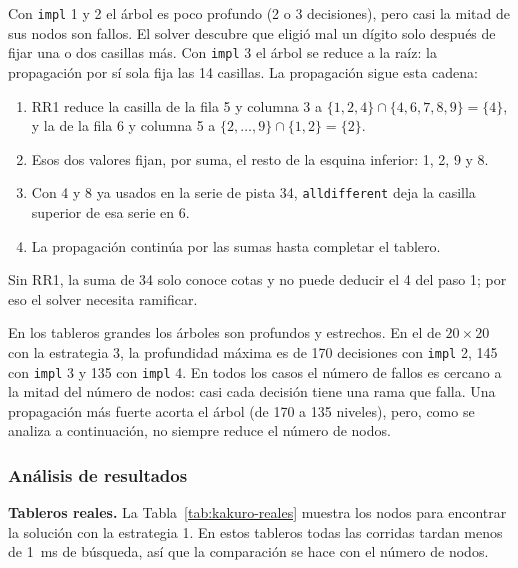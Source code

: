 Con \texttt{impl} 1 y 2 el árbol es poco profundo (2 o 3 decisiones), pero casi la mitad de sus nodos son fallos. El solver descubre que eligió mal un dígito solo después de fijar una o dos casillas más. Con \texttt{impl} 3 el árbol se reduce a la raíz: la propagación por sí sola fija las 14 casillas. La propagación sigue esta cadena:

\begin{enumerate}
    \item RR1 reduce la casilla de la fila 5 y columna 3 a $\{1, 2, 4\} \cap \{4, 6, 7, 8, 9\} = \{4\}$, y la de la fila 6 y columna 5 a $\{2, \dots, 9\} \cap \{1, 2\} = \{2\}$.
    \item Esos dos valores fijan, por suma, el resto de la esquina inferior: 1, 2, 9 y 8.
    \item Con 4 y 8 ya usados en la serie de pista 34, \texttt{alldifferent} deja la casilla superior de esa serie en 6.
    \item La propagación continúa por las sumas hasta completar el tablero.
\end{enumerate}

Sin RR1, la suma de 34 solo conoce cotas y no puede deducir el 4 del paso 1; por eso el solver necesita ramificar.

En los tableros grandes los árboles son profundos y estrechos. En el de $20 \times 20$ con la estrategia 3, la profundidad máxima es de 170 decisiones con \texttt{impl} 2, 145 con \texttt{impl} 3 y 135 con \texttt{impl} 4. En todos los casos el número de fallos es cercano a la mitad del número de nodos: casi cada decisión tiene una rama que falla. Una propagación más fuerte acorta el árbol (de 170 a 135 niveles), pero, como se analiza a continuación, no siempre reduce el número de nodos.

\subsubsection{Análisis de resultados}

\textbf{Tableros reales.} La Tabla~\ref{tab:kakuro-reales} muestra los nodos para encontrar la solución con la estrategia 1. En estos tableros todas las corridas tardan menos de 1~ms de búsqueda, así que la comparación se hace con el número de nodos.

